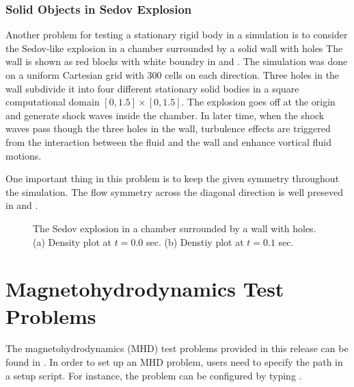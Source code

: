 
\subsubsection{Solid Objects in Sedov Explosion}
\label{Sec:SimulationSedovChamber}
Another problem for testing a stationary rigid body in a simulation is to consider the Sedov-like explosion in a chamber surrounded by
a solid wall with holes The wall is shown as red blocks with white boundry in  and . 
The simulation was done on a uniform Cartesian grid with 300 cells on each direction. Three holes in the wall
subdivide it into four different stationary solid bodies in a square computational domain $[0,1.5] \times [0,1.5]$. The explosion goes
off at the origin and generate shock waves inside the chamber. In later time, when the shock waves pass though the three holes in the wall, 
turbulence effects are triggered from the interaction between the fluid and the wall and enhance vortical fluid motions.

One important thing in this problem is to keep the given symmetry throughout the simulation. The flow symmetry across the diagonal direction
is well preseved in  and .

\begin{figure}[t]
\begin{center}
\caption{
  The Sedov explosion in a chamber surrounded by a wall with holes. (a) Density plot at $t=0.0$ sec. (b) Denstiy plot at $t=0.1$ sec.
}
\end{center}
\end{figure}

\newpage
\section{Magnetohydrodynamics Test Problems}
The magnetohydrodynamics (MHD) test problems provided in this release can be found in
. In order to set up an MHD problem,
users need to specify the  path in a setup script. For instance, the 
problem can be configured by typing .
